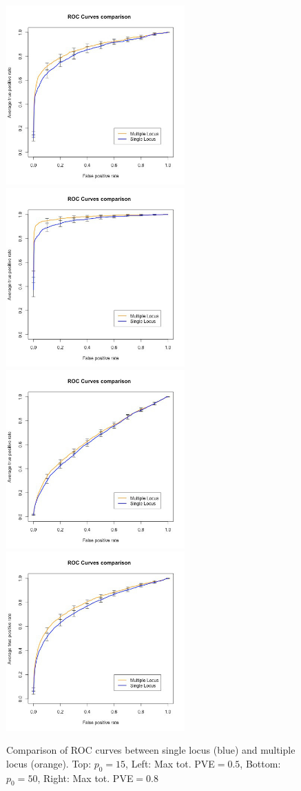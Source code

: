 \documentclass{article}
\numberwithin{equation}{section}
\begin{document}
\begin{figure}[h!]
\includegraphics[width=2.7in, bb= 0 0 1.7in 1.7in]{images/ROC_Comp_p0_15_var_0_5.jpeg}
\includegraphics[width=2.7in, bb= 0 0 1.7in 1.7in]{images/ROC_Comp_p0_15_var_0_8.jpeg}
\includegraphics[width=2.7in, bb= 0 0 1.7in 1.7in]{images/ROC_Comp_p0_50_var_0_5.jpeg}
\includegraphics[width=2.7in, bb= 0 0 1.7in 1.7in]{images/ROC_Comp_p0_50_var_0_8.jpeg}
\caption{\label{fig:ROCComp}Comparison of ROC curves between single locus (blue) and multiple locus (orange). Top: $p_0 = 15$, Left: Max tot. PVE$ = 0.5$,
Bottom: $p_0 = 50$, Right: Max tot. PVE$ = 0.8$}
\end{figure}
\end{document}
